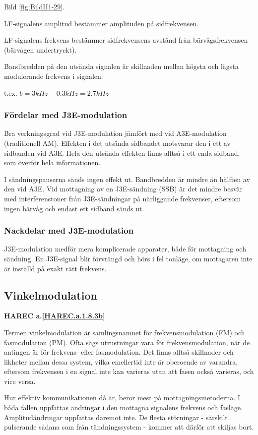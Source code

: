 Bild \ref{fig:BildII1-29}.

LF-signalens amplitud bestämmer amplituden på sidfrekvensen.

LF-signalens frekvens bestämmer sidfrekvensens avstånd från bärvågsfrekvensen
(bärvågen undertryckt).

Bandbredden på den utsända signalen är skillnaden mellan högsta och lägsta
modulerande frekvens i signalen:

t.ex. \(b = 3kHz - 0.3 kHz = 2.7 kHz\)

\subsubsection{Fördelar med J3E-modulation}
Bra verkningsgrad vid J3E-modulation jämfört med vid A3E-modulation
(traditionell AM). Effekten i det utsända sidbandet motsvarar den i ett av
sidbanden vid A3E. Hela den utsända effekten finns alltså i ett enda sidband,
som överför hela informationen.

I sändningspauserna sänds ingen effekt ut. Bandbredden är mindre än hälften av
den vid A3E. Vid mottagning av en J3E-sändning (SSB) är det mindre besvär med
interferenstoner från J3E-sändningar på närliggande frekvenser, eftersom ingen
bärvåg och endast ett sidband sänds ut.

\subsubsection{Nackdelar med J3E-modulation}
J3E-modulation medför mera komplicerade apparater, både för mottagning och
sändning. En J3E-signal blir förvrängd och hörs i fel tonläge, om mottagaren
inte är inställd på exakt rätt frekvens.

\subsection{Vinkelmodulation}
\textbf{HAREC a.\ref{HAREC.a.1.8.3b}\label{myHAREC.a.1.8.3b}}

Termen vinkelmodulation är samlingsnamnet för frekvensmodulation (FM) och
fasmodulation (PM). Ofta sägs utrustningar vara för frekvensmodulation, när de
antingen är för frekvens- eller fasmodulation. Det finns alltså skillnader och
likheter mellan dessa system, vilka emellertid inte är oberoende av varandra,
eftersom frekvensen i en signal inte kan varieras utan att fasen också
varieras, och vice versa.

Hur effektiv kommunikationen då är, beror mest på mottagningsmetoderna. I båda
fallen uppfattas ändringar i den mottagna signalens frekvens och fasläge.
Amplitudändringar uppfattas däremot inte. De flesta störningar - särskilt
pulserande sådana som från tändningssystem - kommer att därför att skiljas bort.

